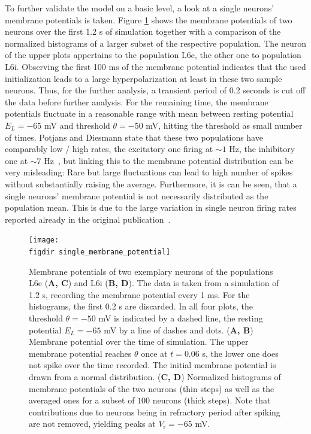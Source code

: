To further validate the model on a basic level, a look at a single neurons' membrane potentials 
is taken. Figure \ref{fig:single_membrane_potential} shows the membrane 
potentials of two neurons over the first 1.2 s of simulation together with a comparison of
the normalized histograms of a larger subset of the 
respective population. The neuron of the upper plots appertains to the population
L6e, the other one to population L6i. 
Observing the first 100 ms of the membrane potential 
indicates that the used initialization leads to a large hyperpolarization at least in these two 
sample neurons. Thus, for the further analysis, a transient period of 0.2 seconds is cut off the
data before further analysis. For the remaining time, the membrane potentials fluctuate 
in a reasonable range with mean between resting potential $E_L = -65$ mV and threshold $\theta = -50$ mV, 
hitting the threshold as small number of times. 
Potjans and Diesmann state that
these two populations have comparably low / high rates, the excitatory one firing at 
$\sim 1$ Hz, the inhibitory one at $\sim 7$ Hz~\cite{potjans2014}, 
but linking this to the membrane potential distribution can be very misleading:
Rare but large fluctuations can lead to high number of spikes without substantially 
raising the average. 
Furthermore, it is can be seen, that a single 
neurons' membrane potential is not necessarily distributed as the population mean. 
This is due to the large variation in single neuron firing rates reported already in the 
original publication~\cite{potjans2014}. 

\begin{figure}[tb]
    \centering
    \texttt{[image: \\figdir single\_membrane\_potential]}
    \caption{
        Membrane potentials of two exemplary neurons of the populations 
        L6e (\textbf{A, C}) and L6i (\textbf{B, D}). The data is taken from 
        a simulation of 1.2 s, recording the membrane potential every 1 ms.
        For the histograms, the first 0.2 s are discarded. 
        In all four plots, the threshold $\theta = -50$ mV is indicated by a dashed line, 
        the resting potential $E_L = -65$ mV by a line of dashes and dots. 
        \quad (\textbf{A, B}) Membrane potential over the time of simulation. 
        The upper membrane potential reaches $\theta$ once at $t = 0.06$ s, 
        the lower one does not spike over the time recorded. 
        The initial membrane potential 
        is drawn from a normal distribution.
        \quad (\textbf{C, D}) Normalized histograms of membrane potentials of the
        two neurons (thin steps) as well as the averaged ones for a subset of $100$ 
        neurons (thick steps). 
        Note that contributions due to neurons being in refractory 
        period after spiking are not removed, yielding peaks at $V_\text{r} = -65$ mV. 
    }
    \label{fig:single_membrane_potential}
\end{figure}



